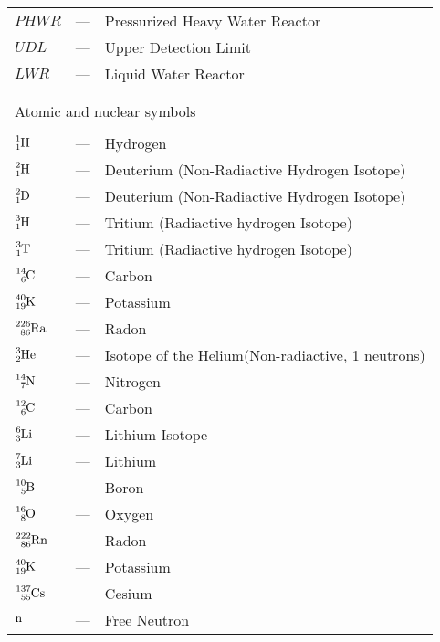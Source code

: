 \begin{longtable}{p{25mm} c p{120mm} }
$PHWR$ & --- & Pressurized Heavy Water Reactor\\
$UDL$ & --- & Upper Detection Limit\\
$LWR$ & --- & Liquid Water Reactor\\

\\
\\
\multicolumn{3}{l}{Atomic and nuclear symbols}\\
\\
$\ce{^{1}_{1}H}$ & --- & Hydrogen\\
$\ce{^{2}_{1}H}$ & --- & Deuterium (Non-Radiactive Hydrogen Isotope)\\
$\ce{^{2}_{1}D}$ & --- & Deuterium (Non-Radiactive Hydrogen Isotope)\\
$\ce{^{3}_{1}H}$ & --- & Tritium (Radiactive hydrogen Isotope)\\
$\ce{^{3}_{1}T}$ & --- & Tritium (Radiactive hydrogen Isotope)\\
$\ce{^{14}_{6}C}$ & --- & Carbon\\
$\ce{^{40}_{19}K}$ & --- & Potassium\\
$\ce{^{226}_{86}Ra}$ & --- & Radon\\
$\ce{^{3}_{2}He}$ & --- & Isotope of the Helium(Non-radiactive, 1 neutrons)\\
$\ce{^{14}_{7}N}$ & --- & Nitrogen\\
$\ce{^{12}_{6}C}$ & --- & Carbon\\
$\ce{^{6}_{3}Li}$ & --- & Lithium Isotope\\
$\ce{^{7}_{3}Li}$ & --- & Lithium\\
$\ce{^{10}_{5}B}$ & --- & Boron\\
$\ce{^{16}_{8}O}$ & --- & Oxygen\\
$\ce{^{222}_{86}Rn}$ & --- & Radon\\
$\ce{^{40}_{19}K}$ & --- & Potassium\\
$\ce{^{137}_{55}Cs}$ & --- & Cesium\\
$\ce{n}$ & --- & Free Neutron\\

\end{longtable}
